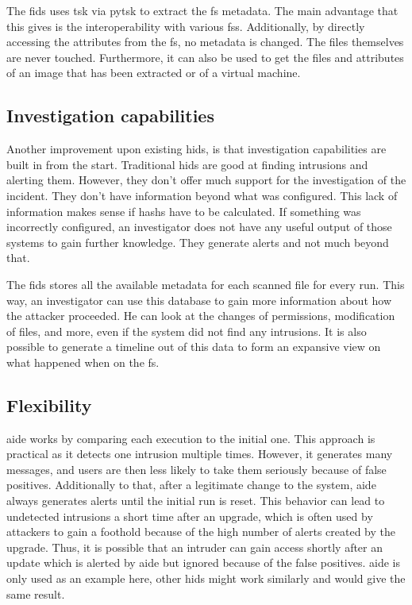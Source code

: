 The \gls{fids} uses \gls{tsk} via \gls{pytsk} to extract the \gls{fs} \gls{metadata}. The main advantage that this gives is the interoperability with various \glspl{fs}. Additionally, by directly accessing the attributes from the \gls{fs}, no \gls{metadata} is changed. The files themselves are never touched. Furthermore, it can also be used to get the files and attributes of an image that has been extracted or of a virtual machine. 

\subsection{Investigation capabilities}
\label{sec:investigation:capabilities}

Another improvement upon existing \gls{hids}, is that investigation capabilities are built in from the start. Traditional \gls{hids} are good at finding intrusions and alerting them. However, they don't offer much support for the investigation of the incident. They don't have information beyond what was configured. This lack of information makes sense if  \glspl{hash} have to be calculated. If something was incorrectly configured, an investigator does not have any useful output of those systems to gain further knowledge. They generate alerts and not much beyond that.

The \gls{fids} stores all the available \gls{metadata} for each scanned file for every run. This way, an investigator can use this database to gain more information about how the attacker proceeded. He can look at the changes of permissions, modification of files, and more, even if the system did not find any intrusions. It is also possible to generate a timeline out of this data to form an expansive view on what happened when on the \gls{fs}. 

\subsection{Flexibility}

\Gls{aide} works by comparing each execution to the initial one. This approach is practical as it detects one intrusion multiple times. However, it generates many messages, and users are then less likely to take them seriously because of false positives. Additionally to that, after a legitimate change to the system, \gls{aide} always generates alerts until the initial run is reset. This behavior can lead to undetected intrusions a short time after an upgrade, which is often used by attackers to gain a foothold because of the high number of alerts created by the upgrade. Thus, it is possible that an intruder can gain access shortly after an update which is alerted by \gls{aide} but ignored because of the false positives. \Gls{aide} is only used as an example here, other \gls{hids} might work similarly and would give the same result.

